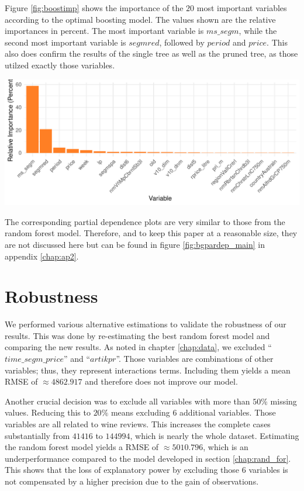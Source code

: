 \documentclass[11pt,]{article}
\let\origfigure\figure
\let\endorigfigure\endfigure
\renewenvironment{figure}[1][2] {
    \expandafter\origfigure\expandafter[H]
} {
    \endorigfigure
}
\begin{document}
Figure \ref{fig:boostimp} shows the importance of the \(20\) most
important variables according to the optimal boosting model. The values
shown are the relative importances in percent. The most important
variable is \(ms\_segm\), while the second most important variable is
\(segmred\), followed by \(period\) and \(price\). This also does
confirm the results of the single tree as well as the pruned tree, as
those utilzed exactly those variables.

\begin{figure}
\centering
\includegraphics{../00_data/output_paper/12_var_imp_boosting_bp.pdf}
\caption{\label{fig:boostimp}Boosting: Variable Importance Plot.}
\end{figure}

The corresponding partial dependence plots are very similar to those
from the random forest model. Therefore, and to keep this paper at a
reasonable size, they are not discussed here but can be found in figure
\ref{fig:bgpardep_main} in appendix \ref{chap:ap2}.

\hypertarget{robustness}{%
\section{\texorpdfstring{Robustness
\label{chap:rob}}{Robustness }}\label{robustness}}

We performed various alternative estimations to validate the robustness
of our results. This was done by re-estimating the best random forest
model and comparing the new results. As noted in chapter
\ref{chap:data}, we excluded \enquote{\(time\_segm\_price\)} and
\enquote{\(artikpr\)}. Those variables are combinations of other
variables; thus, they represent interactions terms. Including them
yields a mean \ac{RMSE} of \(\approx4862.917\) and therefore does not
improve our model.

Another crucial decision was to exclude all variables with more than
\(50\%\) missing values. Reducing this to \(20\%\) means excluding \(6\)
additional variables. Those variables are all related to wine reviews.
This increases the complete cases substantially from \(41416\) to
\(144994\), which is nearly the whole dataset. Estimating the random
forest model yields a \ac{RMSE} of \(\approx5010.796\), which is an
underperformance compared to the model developed in section
\ref{chap:rand_for}. This shows that the loss of explanatory power by
excluding those \(6\) variables is not compensated by a higher precision
due to the gain of observations.
\end{document}
